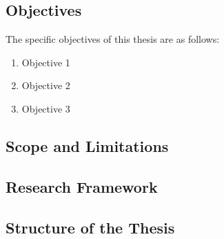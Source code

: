 
\subsection{Objectives}

The specific objectives of this thesis are as follows:
\begin{enumerate}
  \item Objective 1
  \item Objective 2
  \item Objective 3
\end{enumerate}

\subsection{Scope and Limitations}


\subsection{Research Framework}


\subsection{Structure of the Thesis}


